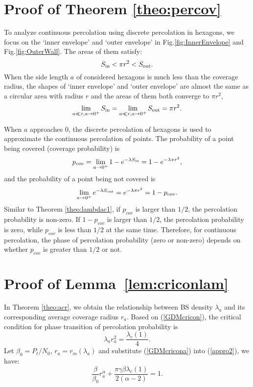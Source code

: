 \documentclass[final]{IEEEtran}
\begin{document}
\section{Proof of Theorem \ref{theo:percov}}\label{app:pcov}
\indent To analyze continuous percolation using discrete percolation in hexagons, we focus on the `inner envelope' and `outer envelope' in Fig.\ref{fig:InnerEnvelope} and Fig.\ref{fig:OuterWall}. The areas of them satisfy:
\begin{equation}
    S_{\rm in}<\pi r^2<S_{\rm out}.
\end{equation}
\indent When the side length $a$ of considered hexagons is much less than the coverage radius, the shapes of `inner envelope' and `outer envelope' are almost the same as a circular area with radius $r$ and the areas of them both converge to $\pi r^2$, \ie
\begin{equation}
    \lim\limits_{a\ll r, a\rightarrow 0^+}S_{\rm in}=\lim\limits_{a\ll r, a\rightarrow 0^+}S_{\rm out}=\pi r^2.
\end{equation}

When $a$ approaches 0, the discrete percolation of hexagons is used to approximate the continuous percolation of points. The probability of a point being covered (\ie coverage probability) is 
\begin{equation}
    p_{cov}=\lim\limits_{a\rightarrow 0^+}1-e^{-\lambda S_{\rm in}}=1-e^{-\lambda\pi r^2},
\end{equation} 
and the probability of a point being not covered is
\begin{equation}
    \lim\limits_{a\rightarrow 0^+}e^{-\lambda S_{\rm out}}=e^{-\lambda\pi r^2}=1-p_{cov}.
\end{equation} 
\indent Similar to Theorem \ref{theo:lambdac1}, if $p_{cov}$ is larger than $1/2$, the percolation probability is non-zero. If $1-p_{cov}$ is larger than $1/2$, the percolation probability is zero, while $p_{cov}$ is less than $1/2$ at the same time. Therefore, for continuous percolation, the phase of percolation probability (zero or non-zero) depends on whether $p_{cov}$ is greater than $1/2$ or not.

\section{Proof of Lemma~\ref{lem:criconlam}}\label{app:criconlam}
\indent In Theorem \ref{theo:acr}, we obtain the relationship between BS density $\lambda_a$ and its corresponding average coverage radius $r_{a}$. Based on (\ref{GDMcricon}), the critical condition for phase transition of percolation probability is 
\begin{equation}\label{GDMcricona}
\lambda_a r_{a}^2=\frac{\lambda_c(1)}{4}.
\end{equation}
\indent Let $\beta_0=P_t/N_0$, $r_a=r_{m}(\lambda_a)$ and substitute (\ref{GDMcricona}) into (\ref{appro2}), we have:
\begin{equation}\label{percona}
    \frac{\beta}{\beta_0}r_{a}^{\alpha}+\frac{\pi\gamma\beta\lambda_c(1)}{2(\alpha-2)}=1.
\end{equation}
\end{document}
